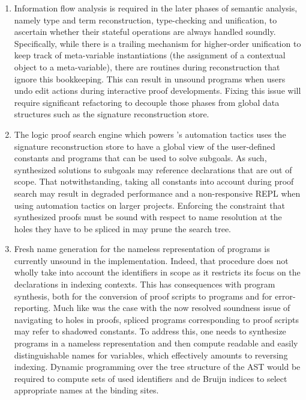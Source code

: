 \begin{enumerate}
\item
Information flow analysis is required in the later phases of semantic analysis, namely type and term reconstruction, type-checking and unification, to ascertain whether their stateful operations are always handled soundly.
Specifically, while there is a trailing mechanism for higher-order unification to keep track of meta-variable instantiations (the assignment of a contextual object to a meta-variable), there are routines during \LF reconstruction that ignore this bookkeeping.
This can result in unsound programs when users undo edit actions during interactive proof developments.
Fixing this issue will require significant refactoring to decouple those phases from global data structures such as the signature reconstruction store.
\item
The logic proof search engine which powers \Harpoon's automation tactics uses the signature reconstruction store to have a global view of the user-defined constants and programs that can be used to solve subgoals.
As such, synthesized solutions to subgoals may reference declarations that are out of scope.
That notwithstanding, taking all constants into account during proof search may result in degraded performance and a non-responsive \ac{REPL} when using automation tactics on larger projects.
Enforcing the constraint that synthesized proofs must be sound with respect to name resolution at the holes they have to be spliced in may prune the search tree.
\item
Fresh name generation for the nameless representation of \Beluga programs is currently unsound in the implementation.
Indeed, that procedure does not wholly take into account the identifiers in scope as it restricts its focus on the declarations in indexing contexts.
This has consequences with program synthesis, both for the conversion of \Harpoon proof scripts to \Beluga programs and for error-reporting.
Much like was the case with the now resolved soundness issue of navigating to holes in \Harpoon proofs, spliced \Beluga programs corresponding to \Harpoon proof scripts may refer to shadowed constants.
To address this, one needs to synthesize programs in a nameless representation and then compute readable and easily distinguishable names for variables, which effectively amounts to reversing indexing.
Dynamic programming over the tree structure of the \ac{AST} would be required to compute sets of used identifiers and de Bruijn indices to select appropriate names at the binding sites.
\end{enumerate}

